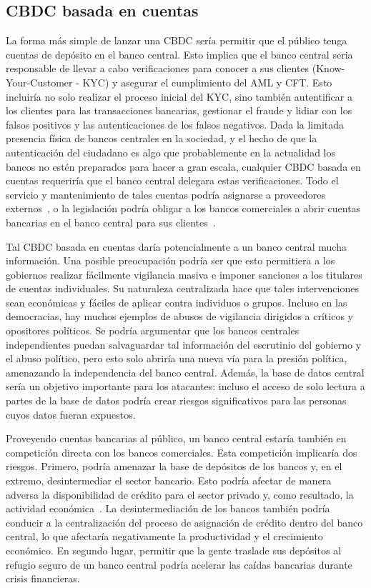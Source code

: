 \documentclass[a4paper,10pt]{article} %
\begin{document}
\subsection{CBDC basada en cuentas}\label{cbdc-basada-en-cuentas}

La forma más simple de lanzar una CBDC sería permitir que el público
tenga cuentas de depósito en el banco central. Esto implica que el banco
central seria responsable de llevar a cabo verificaciones para conocer a
sus clientes (Know-Your-Customer - KYC) y asegurar el cumplimiento del
AML y CFT. Esto incluiría no solo realizar el proceso inicial del KYC,
sino también autentificar a los clientes para las transacciones
bancarias, gestionar el fraude y lidiar con los falsos positivos y las
autenticaciones de los falsos negativos. Dada la limitada presencia
física de bancos centrales en la sociedad, y el hecho de que la
autenticación del ciudadano es algo que probablemente en la actualidad
los bancos no estén preparados para hacer a gran escala, cualquier CBDC
basada en cuentas requeriría que el banco central delegara estas
verificaciones. Todo el servicio y mantenimiento de tales cuentas podría
asignarse a proveedores externos~\cite{Bindseil}, o la legislación
podría obligar a los bancos comerciales a abrir cuentas bancarias en el
banco central para sus clientes~\cite{Berentsen}.

Tal CBDC basada en cuentas daría potencialmente a un banco central mucha
información. Una posible preocupación podría ser que esto permitiera a
los gobiernos realizar fácilmente vigilancia masiva e imponer sanciones
a los titulares de cuentas individuales. Su naturaleza centralizada hace
que tales intervenciones sean económicas y fáciles de aplicar contra
individuos o grupos. Incluso en las democracias, hay muchos ejemplos de
abusos de vigilancia dirigidos a críticos y opositores políticos. Se
podría argumentar que los bancos centrales independientes puedan
salvaguardar tal información del escrutinio del gobierno y el abuso
político, pero esto solo abriría una nueva vía para la presión política,
amenazando la independencia del banco central. Además, la base de datos
central sería un objetivo importante para los atacantes: incluso el
acceso de solo lectura a partes de la base de datos podría crear riesgos
significativos para las personas cuyos datos fueran expuestos.

Proveyendo cuentas bancarias al público, un banco central estaría
también en competición directa con los bancos comerciales. Esta
competición implicaría dos riesgos. Primero, podría amenazar la base de
depósitos de los bancos y, en el extremo, desintermediar el sector
bancario. Esto podría afectar de manera adversa la disponibilidad de
crédito para el sector privado y, como resultado, la actividad
económica~\cite{Agur}. La desintermediación de los bancos también podría
conducir a la centralización del proceso de asignación de crédito dentro
del banco central, lo que afectaría negativamente la productividad y el
crecimiento económico. En segundo lugar, permitir que la gente traslade
sus depósitos al refugio seguro de un banco central podría acelerar las
caídas bancarias durante crisis financieras.
\end{document}
